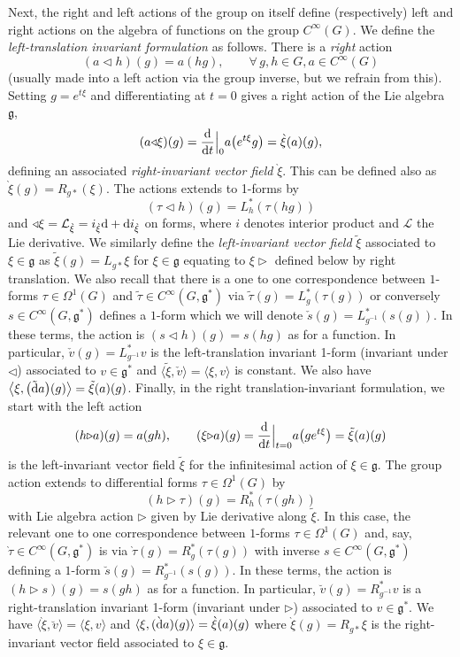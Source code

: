 \documentclass[10pt,a4paper]{amsart}
\numberwithin{equation}{section}
\newcommand{\<}{{\langle}}
\renewcommand{\>}{{\rangle}}
\newcommand{\CL}{{\mathcal{L}}}
\newcommand{\extd}{{\rm d}}
\newcommand{\la}{{\triangleright}}
\newcommand{\ra}{{\triangleleft}}
\newcommand{\cg}{{\mathfrak{g}}}
\newcommand{\tilder}{\grave}
\newcommand{\hatr}{\breve }
\newcommand{\hatl}{\check }
\begin{document}
Next, the right and left actions of the group on itself define (respectively) left and right actions on the algebra of functions on the group $C^\infty(G)$. We define the {\em left-translation invariant formulation} as follows. There is a {\em right} action
\[ (a\ra h)(g)=a(hg), \qquad\forall\, g,h\in G, a\in C^\infty(G) \]
(usually made into a left action via the group inverse, but we refrain from this). Setting $g=e^{t\xi}$ and differentiating at $t=0$ gives a right action of the Lie algebra $\cg$,
\[ (a\ra\xi)(g)=\frac{\extd}{\extd t}\Big|_0a\big(e^{t\xi}g\big)=\tilder\xi(a)(g), \]
defining an associated {\em right-invariant vector field} $\tilder\xi$. This can be defined also as $\tilder\xi(g)=R_{g*}(\xi)$. The actions extends to 1-forms by
\[ (\tau\ra h)(g)=L_h^*(\tau(hg))\]
and $\ra\xi=\CL_{\tilder\xi}=i_{\tilder\xi}\extd+\extd i_{\tilder\xi}$ on forms, where $i$ denotes interior product and $\CL$ the Lie derivative. We similarly define the {\em left-invariant vector field} $\tilde\xi$ associated to $\xi\in\cg$ as $\tilde\xi(g)=L_{g*}\xi$ for $\xi\in \cg$ equating to $\xi\la$ defined below by right translation. We also recall that there is a one to one correspondence between $1$-forms $\tau\in \Omega^1(G)$ and $\tilde{\tau}\in C^\infty(G,\mathfrak{g}^*)$ via $\tilde{\tau}(g)=L^*_{g}(\tau(g))$ or conversely $s\in C^\infty(G,\mathfrak{g}^*)$ defines a $1$-form which we will denote $\hatl{s}(g)=L^*_{g^{-1}}(s(g))$. In these terms, the action is $(s\ra h)(g)=s(hg)$ as for a function. In particular, $\hatl v(g)=L_{g^{-1}}^*v$ is the left-translation invariant 1-form (invariant under $\ra$) associated to $v\in\cg^*$ and $\<\tilde\xi,\hatl v\>=\<\xi,v\>$ is constant. We also have $\big\langle \xi,\big(\tilde\extd a\big)(g)\big\rangle=\tilde\xi(a)(g)$. Finally, in the right translation-invariant formulation, we start with the left action
\[ (h\la a)(g)=a(gh),\qquad (\xi\la a)(g)={\extd \over\extd t}\Big|_{t=0}a\big(ge^{t\xi}\big)=\tilde{\xi}(a)(g)\]
is the left-invariant vector field $\tilde\xi$ for the infinitesimal action of $\xi\in\cg$. The group action extends to differential forms $\tau\in \Omega^1(G)$ by
\[ (h\la\tau)(g)=R^*_{h}(\tau(gh))\]
with Lie algebra action $\la$ given by Lie derivative along $\tilde\xi$. In this case, the relevant one to one correspondence between $1$-forms $\tau\in \Omega^1(G)$ and, say, $\tilder{\tau}\in C^\infty(G,\mathfrak{g}^*)$ is via $\tilder{\tau}(g)=R^*_{g}(\tau(g))$ with inverse $s\in C^\infty(G,\mathfrak{g}^*)$ defining a $1$-form $\hatr{s}(g)=R^*_{g^{-1}}(s(g))$. In these terms, the action is $(h\la s)(g)=s(gh)$ as for a function. In particular, $\hatr v(g)=R_{g^{-1}}^*v$ is a right-translation invariant 1-form (invariant under $\la$) associated to $v\in\cg^*$. We have $\<\tilder\xi,\hatr v\>=\<\xi,v\>$ and $\<\xi,(\tilder\extd a)(g)\>=\tilder\xi(a)(g)$ where $\tilder\xi(g)=R_{g*}\xi$ is the right-invariant vector field associated to $\xi\in\cg$.
\end{document}
